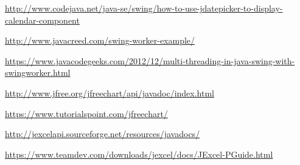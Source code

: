 \documentclass[12pt, a4paper]{book}
\begin{document}
\begin{thebibliography}{10}
	\bibitem[CodeJava]{}
	\newline
	\href{http://www.codejava.net/java-se/swing/how-to-use-jdatepicker-to-display-calendar-component}{http://www.codejava.net/java-se/swing/how-to-use-jdatepicker-to-display-calendar-component}
	
	\newline
	\href{http://www.javacreed.com/swing-worker-example/}{http://www.javacreed.com/swing-worker-example/}
	
	\newline
	\href{https://www.javacodegeeks.com/2012/12/multi-threading-in-java-swing-with-swingworker.html}{https://www.javacodegeeks.com/2012/12/multi-threading-in-java-swing-with-swingworker.html}
	
	\bibitem[jfree]{}
	\newline
	\href{http://www.jfree.org/jfreechart/api/javadoc/index.html}{http://www.jfree.org/jfreechart/api/javadoc/index.html}
	
	\newline
	\href{https://www.tutorialspoint.com/jfreechart/}{https://www.tutorialspoint.com/jfreechart/}
	
	\bibitem[jexcelapi]{}
	\newline
	\href{http://jexcelapi.sourceforge.net/resources/javadocs/}{http://jexcelapi.sourceforge.net/resources/javadocs/}
	
	
	\bibitem[TeamDev]{}
	\newline
	\href{https://www.teamdev.com/downloads/jexcel/docs/JExcel-PGuide.html}{https://www.teamdev.com/downloads/jexcel/docs/JExcel-PGuide.html}
	
	
\end{thebibliography}
\newpage
{}
\printglossary[type=\acronymtype]
\end{document}

